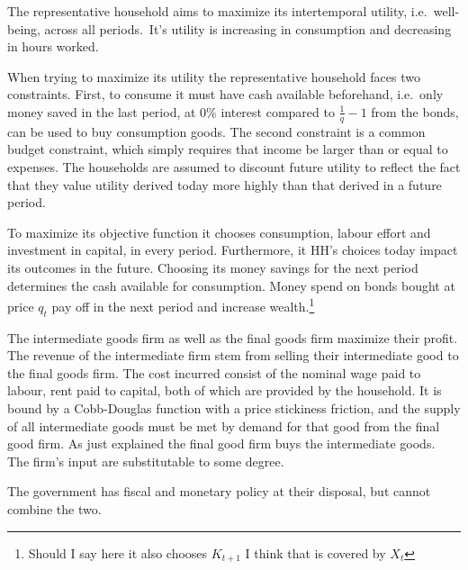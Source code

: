 \documentclass[12pt]{article}
\begin{document}
The representative household aims to maximize its intertemporal utility, i.e.~well-being, across all periods.\ It's utility is increasing in consumption and decreasing in hours worked. 

When trying to maximize its utility the representative household faces two constraints. First, to consume it must have cash available beforehand, i.e.\ only money saved in the last period, at 0\% interest compared to $\frac{1}{q} -1$ from the bonds, can be used to buy consumption goods. 
The second constraint is a common budget constraint, which simply requires that income be larger than or equal to expenses.  The households are assumed to discount future utility to reflect the fact that they value utility derived today more highly than that derived in a future period.

To maximize its objective function it chooses consumption, labour effort and investment in capital, in every period. %
Furthermore, it HH's choices today impact its outcomes in the future. Choosing its money savings for the next period determines the cash available for consumption. Money spend on bonds bought at price $q_t$ pay off in the next period and increase wealth.\footnote{Should I say here it also chooses $K_{t+1}$ I think that is covered by $X_t$} 

The intermediate goods firm as well as the final goods firm maximize their profit. The revenue of the intermediate firm stem from selling their intermediate good to the final goods firm. The cost incurred consist of the nominal wage paid to labour, rent paid to capital, both of which are provided by the household. It is bound by a Cobb-Douglas function with a price stickiness friction, and the supply of all intermediate goods must be met by demand for that good from the final good firm.  As just explained the final good firm buys the intermediate goods. The firm's input are substitutable to some degree. 

The government has fiscal and monetary policy at their disposal, but cannot combine the two. 
\end{document}
